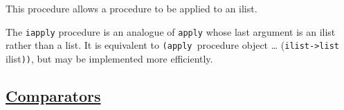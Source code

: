 This procedure allows a procedure to be applied to an ilist.

\begin{description}
\tightlist
\item[ \href{}{} \texttt{iapply} procedure object \ldots{} ilist
-\textgreater{} object ]
The \texttt{iapply} procedure is an analogue of \texttt{apply} whose
last argument is an ilist rather than a list. It is equivalent to
\texttt{(apply\ }procedure object \ldots{}
(\texttt{ilist-\textgreater{}list} ilist\texttt{))}, but may be
implemented more efficiently.
\end{description}

\subsection{\texorpdfstring{\href{}{Comparators}}{Comparators}}\label{comparators}

